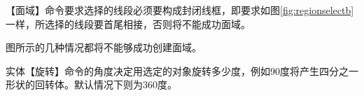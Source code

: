 \begin{tips}
\item 【面域】命令要求选择的线段必须要构成封闭线框，即要求如图\ref{fig:regionselectb}一样，所选择的线段要首尾相接，否则将不能成功面域。
\item 图所示的几种情况都将不能够成功创建面域。
\begin{figure}[htbp]
\centering
{}\hspace{20pt}
\hspace{20pt}
\hspace{20pt}
\end{figure}
\item 实体【旋转】命令的角度决定用选定的对象旋转多少度，例如90度将产生四分之一形状的回转体。默认情况下则为360度。
\end{tips}
\endinput